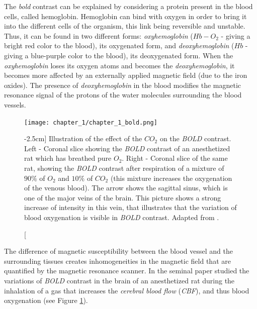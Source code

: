 
%
The \emph{\gls{bold}} contrast can be explained by considering a protein present in
the blood
cells, called hemoglobin. Hemoglobin can bind with oxygen in order to bring it
into the different cells of the organism, this link being reversible and
unstable. Thus, it can be found in two different forms: \emph{oxyhemoglobin}
($Hb-O_{2}$ - giving a bright red color to the blood), its oxygenated form, and
\emph{deoxyhemoglobin} ($Hb$ - giving a blue-purple color to the blood), its
deoxygenated form.
%
%
%
%
When the \emph{oxyhemoglobin} loses its oxygen atoms and
becomes the \emph{deoxyhemoglobin}, it becomes more affected by an externally applied magnetic field (due to the iron
oxides). The presence of
\emph{deoxyhemoglobin} in the blood modifies the
magnetic resonance signal of the protons of the water molecules surrounding the blood
vessels. 

\begin{figure}
\centering
\texttt{[image: chapter\_1/chapter\_1\_bold.png]}
\caption[][-2.5cm]{
Illustration of the effect of the $CO_2$ on the \emph{BOLD} contrast.
Left - Coronal slice showing the \emph{BOLD} contrast of an anesthetized rat
which has breathed pure $O_2$. Right - Coronal slice of the same rat, showing the \emph{BOLD} contrast after respiration of a mixture of $90\%$ of $O_2$ and $10\%$ of $CO_2$ (this mixture
increases the oxygenation of the venous blood). The arrow shows 
the sagittal sinus, which is one of the major veins of the brain. This picture shows a strong increase of intensity in this vein, that illustrates that the
variation of blood oxygenation is visible in \emph{BOLD} contrast.
Adapted from \citep{ogawa1990b}.}\label{fig:chapter_1_ogawa}
\end{figure}


The difference of magnetic
susceptibility between the
blood vessel and the surrounding tissues creates 
inhomogeneities in the magnetic field \citep{thulborn1982,ogawa1990a} that are quantified by the magnetic resonance scanner. In the seminal paper \citep{ogawa1990b} studied the variations of
\emph{BOLD} contrast in the brain of an anesthetized rat during the inhalation of a gas
 that increases the \emph{cerebral blood flow} (\emph{CBF}), and thus blood
oxygenation (see Figure
\ref{fig:chapter_1_ogawa}).


